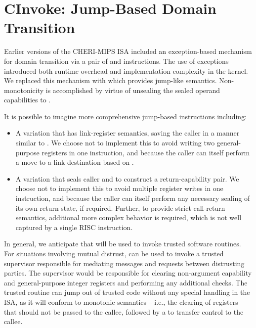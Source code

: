 \section{CInvoke: Jump-Based Domain Transition}
\label{sec:jump-based-domain-transition}

Earlier versions of the CHERI-MIPS ISA included an exception-based
mechanism for domain transition via a pair of 
and  instructions.  The use of exceptions
introduced both runtime overhead and implementation complexity in the
kernel.  We replaced this mechanism with 
which provides jump-like semantics.
Non-monotonicity is accomplished by virtue of unsealing the sealed
operand capabilities to .

It is possible to imagine more comprehensive jump-based instructions
including:
\begin{itemize}
\item A variation that has link-register semantics, saving the caller \PCC{}
  in a manner similar to .
  We choose not to implement this to avoid writing two general-purpose registers
  in one instruction, and because the
  caller can itself perform a move to a link destination based on
  .

\item A variation that seals caller \PCC{} and \IDC{} to construct a
  return-capability pair.
  We choose not to implement this to avoid multiple register writes in one instruction,
  and because the
  caller can itself perform any necessary sealing of its own return state, if
  required.
  Further, to provide strict call-return semantics, additional more complex
  behavior is required, which is not well captured by a single RISC
  instruction.
\end{itemize}

In general, we anticipate that  will be used
to invoke trusted software routines.  For situations involving
mutual distrust,  can be used to invoke
a trusted supervisor responsible for mediating messages and
requests between distrusting parties.  The supervisor would be
responsible for clearing non-argument capability and general-purpose
integer registers and performing any additional checks.
The  trusted
routine can jump out of trusted code without
any special handling in the ISA, as it will conform to monotonic
semantics -- i.e., the clearing of registers that should not be passed to the
callee, followed by a  to transfer control to the callee.

